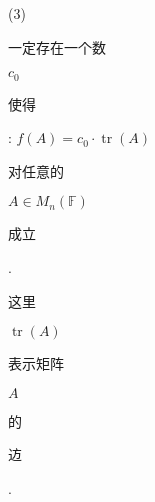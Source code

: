 \documentclass[10pt]{article}
\begin{document}
(3) \begin{CJK}{UTF8}{mj}一定存在一个数\end{CJK} $c_{0}$ \begin{CJK}{UTF8}{mj}使得\end{CJK}: $f(A)=c_{0} \cdot \operatorname{tr}(A)$ \begin{CJK}{UTF8}{mj}对任意的\end{CJK} $A \in M_{n}(\mathbb{F})$ \begin{CJK}{UTF8}{mj}成立\end{CJK}. \begin{CJK}{UTF8}{mj}这里\end{CJK} $\operatorname{tr}(A)$ \begin{CJK}{UTF8}{mj}表示矩阵\end{CJK} $A$ \begin{CJK}{UTF8}{mj}的\end{CJK} \begin{CJK}{UTF8}{mj}䢍\end{CJK}.
\end{document}
